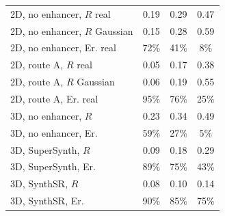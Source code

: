 \begin{table}[!htbp]
{\begin{tabular*}{\linewidth}{@{\extracolsep{\fill}}lccc@{}}
\midrule
2D, no enhancer, $R$ real & 0.19 & 0.29 & 0.47 \\
2D, no enhancer, $R$ Gaussian & 0.15 & 0.28 & 0.59 \\
2D, no enhancer, Er. real & 72\% & 41\% & 8\% \\
2D, route A, $R$ real & 0.05 & 0.17 & 0.38 \\
2D, route A, $R$ Gaussian & 0.06 & 0.19 & 0.55 \\
2D, route A, Er. real & 95\% & 76\% & 25\% \\
\midrule
3D, no enhancer, $R$ & 0.23 & 0.34 & 0.49 \\
3D, no enhancer, Er. & 59\% & 27\% & 5\% \\
3D, SuperSynth, $R$ & 0.09 & 0.18 & 0.29 \\
3D, SuperSynth, Er. & 89\% & 75\% & 43\% \\
3D, SynthSR, $R$ & 0.08 & 0.10 & 0.14 \\
3D, SynthSR, Er. & 90\% & 85\% & 75\% \\
\bottomrule
\end{tabular*}}
\end{table}
